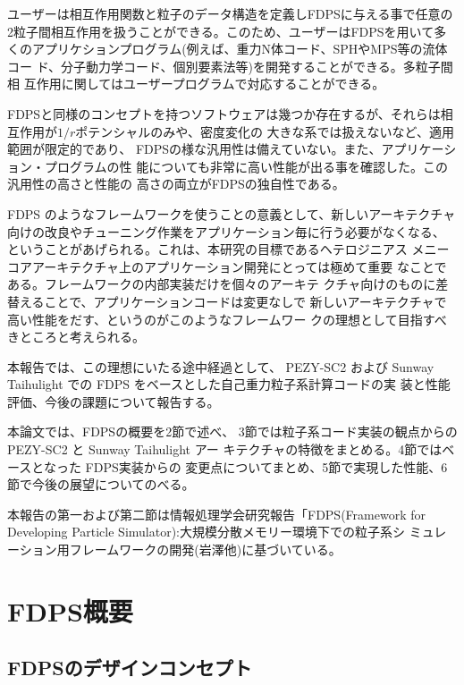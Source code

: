 \documentclass[a4j]{jarticle}
\begin{document}
ユーザーは相互作用関数と粒子のデータ構造を定義しFDPSに与える事で任意の
2粒子間相互作用を扱うことができる。このため、ユーザーはFDPSを用いて多
くのアプリケションプログラム(例えば、重力N体コード、SPHやMPS等の流体コー
ド、分子動力学コード、個別要素法等)を開発することができる。多粒子間相
互作用に関してはユーザープログラムで対応することができる。

FDPSと同様のコンセプトを持つソフトウェアは幾つか存在するが、それらは相
互作用が$1/r$ポテンシャルのみや\cite{1995CoPhC..87..266W}、密度変化の
大きな系では扱えないなど\cite{Leisheng823}、適用範囲が限定的であり、
FDPSの様な汎用性は備えていない。また、アプリケーション・プログラムの性
能についても非常に高い性能が出る事を確認した。この汎用性の高さと性能の
高さの両立がFDPSの独自性である。

FDPS のようなフレームワークを使うことの意義として、新しいアーキテクチャ
向けの改良やチューニング作業をアプリケーション毎に行う必要がなくなる、
ということがあげられる。これは、本研究の目標であるヘテロジニアス
メニーコアアーキテクチャ上のアプリケーション開発にとっては極めて重要
なことである。フレームワークの内部実装だけを個々のアーキテ
クチャ向けのものに差替えることで、アプリケーションコードは変更なしで
新しいアーキテクチャで高い性能をだす、というのがこのようなフレームワー
クの理想として目指すべきところと考えられる。

本報告では、この理想にいたる途中経過として、 PEZY-SC2 および
Sunway Taihulight での FDPS をベースとした自己重力粒子系計算コードの実
装と性能評価、今後の課題について報告する。

本論文では、FDPSの概要を2節で述べ、
3節では粒子系コード実装の観点からの PEZY-SC2 と Sunway Taihulight アー
キテクチャの特徴をまとめる。4節ではベースとなった FDPS実装からの
変更点についてまとめ、5節で実現した性能、6節で今後の展望についてのべる。

本報告の第一および第二節は情報処理学会研究報告「FDPS(Framework for
 Developing Particle Simulator):大規模分散メモリー環境下での粒子系シ
  ミュレーション用フレームワークの開発(岩澤他)に基づいている。



\section{FDPS概要}

\subsection{FDPSのデザインコンセプト}
\end{document}
